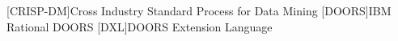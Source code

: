 
\begin{acronym}
	[CRISP-DM]{Cross Industry Standard Process for Data Mining}
	[DOORS]{IBM Rational DOORS}
	[DXL]{DOORS Extension Language}
\end{acronym}


